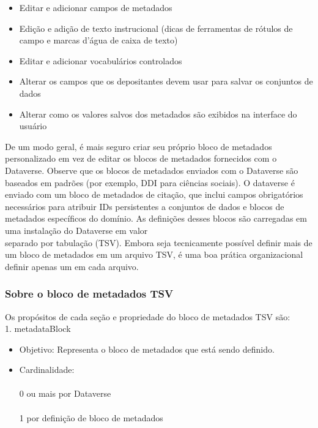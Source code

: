 \documentclass[12pt,hidelinks]{article}
\begin{document}
\begin{itemize}

\item Editar e adicionar campos de metadados

\item Edição e adição de texto instrucional (dicas de ferramentas de rótulos de campo e marcas d'água de caixa de texto)

\item Editar e adicionar vocabulários controlados

\item Alterar os campos que os depositantes devem usar para salvar os conjuntos de dados

\item Alterar como os valores salvos dos metadados são exibidos na interface do usuário

\end{itemize}

De um modo geral, é mais seguro criar seu próprio bloco de metadados \\personalizado em vez de editar os blocos de metadados fornecidos com o Dataverse. Observe que os blocos de metadados enviados com o Dataverse são baseados em padrões (por exemplo, DDI para ciências sociais). O dataverse é enviado com um bloco de metadados de citação, que inclui campos obrigatórios necessários para atribuir IDs persistentes a conjuntos de dados e blocos de metadados específicos do domínio. As definições desses blocos são carregadas em uma instalação do Dataverse em valor \\separado por tabulação (TSV). Embora seja tecnicamente possível definir mais de um bloco de metadados em um arquivo TSV, é uma boa prática organizacional definir apenas um em cada arquivo.

\subsubsection{Sobre o bloco de metadados TSV}

 \qquad Os propósitos de cada seção e propriedade do bloco de metadados TSV são:\\

1. metadataBlock

\begin{itemize}
   
 \item Objetivo: Representa o bloco de metadados que está sendo definido.
 
 \item Cardinalidade:\\\\
0 ou mais por Dataverse\\\\
1 por definição de bloco de metadados

\end{itemize}
\end{document}
